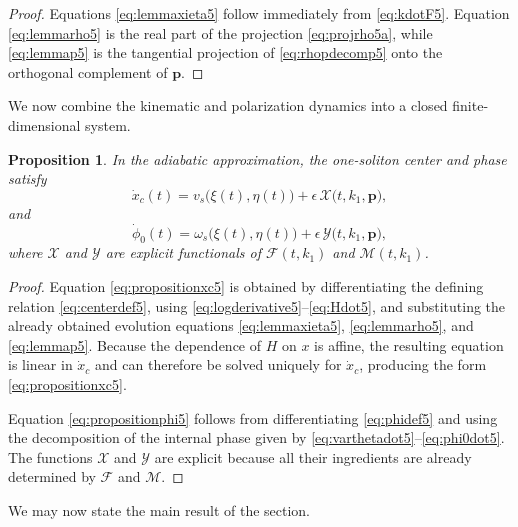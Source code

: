 \documentclass[11pt]{amsart}
\newtheorem{proposition}{Proposition}[section]
\theoremstyle{definition}
\numberwithin{equation}{section}
\begin{document}
\begin{proof}
Equations \eqref{eq:lemmaxieta5} follow immediately from \eqref{eq:kdotF5}. Equation \eqref{eq:lemmarho5} is the real part of the projection \eqref{eq:projrho5a}, while \eqref{eq:lemmap5} is the tangential projection of \eqref{eq:rhopdecomp5} onto the orthogonal complement of $\mathbf p$.
\end{proof}

We now combine the kinematic and polarization dynamics into a closed finite-dimensional system.

\begin{proposition}
In the adiabatic approximation, the one-soliton center and phase satisfy
\begin{equation}
\dot{x}_c(t)=v_s\bigl(\xi(t),\eta(t)\bigr)+\epsilon\,\mathcal X\bigl(t,k_1,\mathbf p\bigr),
\label{eq:propositionxc5}
\end{equation}
and
\begin{equation}
\dot{\phi}_0(t)=\omega_s\bigl(\xi(t),\eta(t)\bigr)+\epsilon\,\mathcal Y\bigl(t,k_1,\mathbf p\bigr),
\label{eq:propositionphi5}
\end{equation}
where $\mathcal X$ and $\mathcal Y$ are explicit functionals of $\mathcal F(t,k_1)$ and $\mathcal M(t,k_1)$.
\end{proposition}

\begin{proof}
Equation \eqref{eq:propositionxc5} is obtained by differentiating the defining relation \eqref{eq:centerdef5}, using \eqref{eq:logderivative5}--\eqref{eq:Hdot5}, and substituting the already obtained evolution equations \eqref{eq:lemmaxieta5}, \eqref{eq:lemmarho5}, and \eqref{eq:lemmap5}. Because the dependence of $H$ on $x$ is affine, the resulting equation is linear in $\dot x_c$ and can therefore be solved uniquely for $\dot x_c$, producing the form \eqref{eq:propositionxc5}.

Equation \eqref{eq:propositionphi5} follows from differentiating \eqref{eq:phidef5} and using the decomposition of the internal phase given by \eqref{eq:varthetadot5}--\eqref{eq:phi0dot5}. The functions $\mathcal X$ and $\mathcal Y$ are explicit because all their ingredients are already determined by $\mathcal F$ and $\mathcal M$.
\end{proof}

We may now state the main result of the section.
\end{document}
